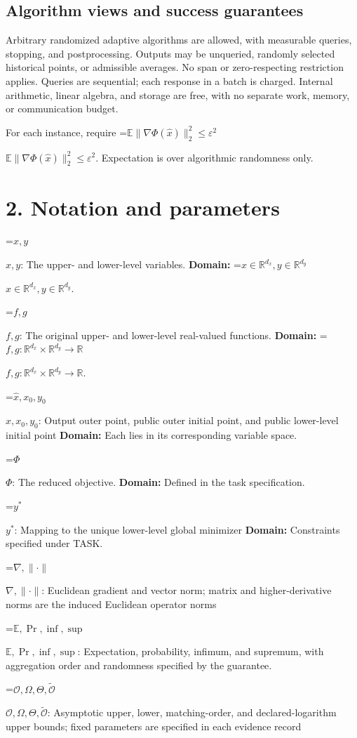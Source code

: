 \documentclass[10pt,a4paper]{article}
\newcommand{\AtlasMath}[1]{\par\begingroup\centering\setbox0=\hbox{$\displaystyle #1$}\ifdim\wd0>1.4\linewidth\typeout{ATLAS WIDE FORMULA: \the\wd0}\fi\ifdim\wd0>\linewidth\resizebox{\linewidth}{!}{\box0}\else\box0\fi\par\endgroup}
\newcommand{\AtlasInlineMath}[1]{\begingroup\setbox0=\hbox{$#1$}\ifdim\wd0>.4\linewidth\endgroup\AtlasMath{#1}\else\endgroup$#1$\fi}
\begin{document}
\subsection{Algorithm views and success guarantees}
Arbitrary randomized adaptive algorithms are allowed, with measurable queries, stopping, and postprocessing. Outputs may be unqueried, randomly selected historical points, or admissible averages. No span or zero-respecting restriction applies. Queries are sequential; each response in a batch is charged. Internal arithmetic, linear algebra, and storage are free, with no separate work, memory, or communication budget.

For each instance, require \AtlasInlineMath{\mathbb{E}\|\nabla\Phi(\widehat{x})\|_2^2\le\varepsilon^2}. Expectation is over algorithmic randomness only.

\section{2. Notation and parameters}
\AtlasInlineMath{x,y}: The upper- and lower-level variables. \textbf{Domain:} \AtlasInlineMath{x\in\mathbb R^{d_x},y\in\mathbb R^{d_y}}.

\AtlasInlineMath{f,g}: The original upper- and lower-level real-valued functions. \textbf{Domain:} \AtlasInlineMath{f,g:\mathbb R^{d_x}\times\mathbb R^{d_y}\to\mathbb R}.

\AtlasInlineMath{\widehat x,x_0,y_0}: Output outer point, public outer initial point, and public lower-level initial point \textbf{Domain:} Each lies in its corresponding variable space.

\AtlasInlineMath{\Phi}: The reduced objective. \textbf{Domain:} Defined in the task specification.

\AtlasInlineMath{y^*}: Mapping to the unique lower-level global minimizer \textbf{Domain:} Constraints specified under TASK.

\AtlasInlineMath{\nabla,\|\cdot\|}: Euclidean gradient and vector norm; matrix and higher-derivative norms are the induced Euclidean operator norms

\AtlasInlineMath{\mathbb E,\Pr,\inf,\sup}: Expectation, probability, infimum, and supremum, with aggregation order and randomness specified by the guarantee.

\AtlasInlineMath{\mathcal O,\Omega,\Theta,\widetilde{\mathcal O}}: Asymptotic upper, lower, matching-order, and declared-logarithm upper bounds; fixed parameters are specified in each evidence record
\end{document}
